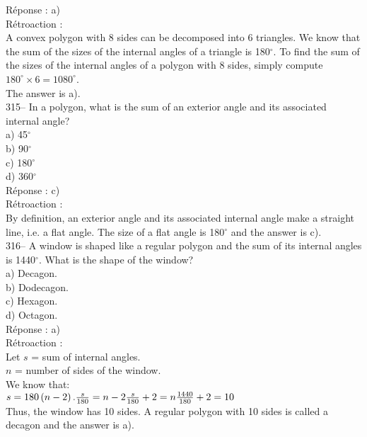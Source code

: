 \documentclass[letterpaper, 12pt]{article}
\begin{document}
R\'eponse : a)\\

R\'etroaction : \\
A convex polygon with 8 sides can be decomposed into 6 triangles. We
know that the sum of the sizes of the internal angles of a triangle
is 180$^{\circ}$. To find the sum of the sizes of the internal
angles of a polygon with 8 sides, simply
compute $180^{\circ}\times6=1080^{\circ}$.\\
The answer is a).\\

315-- In a polygon, what is the sum of an exterior angle and its associated internal angle?\\

a) 45$^{\circ}$\\
b) 90$^{\circ}$\\
c) 180$^{\circ}$\\
d) 360$^{\circ}$\\

R\'eponse : c)\\

R\'etroaction : \\
By definition, an exterior angle and its associated internal angle
make a straight line, i.e. a flat angle.
The size of a flat angle is 180$^{\circ}$ and the answer is c).\\

316-- A window is shaped like a regular polygon and the sum of its internal angles is 1440$^{\circ}$. What is the shape of the window?\\

a) Decagon.\\
b) Dodecagon.\\
c) Hexagon. \\
d) Octagon.\\

R\'eponse : a)\\

R\'etroaction : \\
Let $s$ = sum of internal angles.\\
$n$ = number of sides of the window.\\[2mm]
We know that:\\[2mm]
$s = 180 \left( n-2\right). \\[2mm]
\frac{s}{180}=n-2\\[2mm]
\frac{s}{180}+2=n\\[2mm]
\frac{1440}{180}+2=10$\\[2mm]
Thus, the window has 10 sides. A regular polygon with 10 sides is called a decagon and the answer is a).\\
\end{document}
